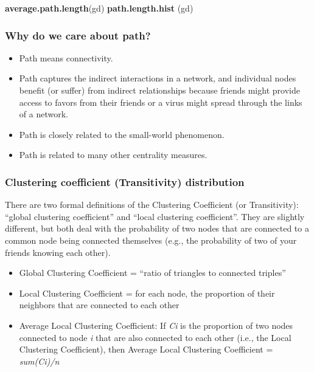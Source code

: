 \documentclass[
]{article}
\newenvironment{Shaded}{\begin{snugshade}}{\end{snugshade}}
\newcommand{\FunctionTok}[1]{\textcolor[rgb]{0.13,0.29,0.53}{\textbf{#1}}}
\newcommand{\NormalTok}[1]{#1}
\providecommand{\tightlist}{%
  \setlength{\itemsep}{0pt}\setlength{\parskip}{0pt}}
\begin{document}
\footnotesize

\begin{Shaded}
\begin{Highlighting}[]
\FunctionTok{average.path.length}\NormalTok{(gd)}
\FunctionTok{path.length.hist}\NormalTok{ (gd)}
\end{Highlighting}
\end{Shaded}

\normalsize

\hypertarget{why-do-we-care-about-path}{%
\subsubsection{Why do we care about path?}\label{why-do-we-care-about-path}}

\begin{itemize}
\item
  Path means connectivity.
\item
  Path captures the indirect interactions in a network, and individual nodes benefit (or suffer) from indirect relationships because friends might provide access to favors from their friends or a virus might spread through the links of a network.
\item
  Path is closely related to the small-world phenomenon.
\item
  Path is related to many other centrality measures.
\end{itemize}

\hypertarget{clustering-coefficient-transitivity-distribution}{%
\subsubsection{Clustering coefficient (Transitivity) distribution}\label{clustering-coefficient-transitivity-distribution}}

There are two formal definitions of the Clustering Coefficient (or Transitivity): ``global clustering coefficient'' and ``local clustering coefficient''. They are slightly different, but both deal with the probability of two nodes that are connected to a common node being connected themselves (e.g., the probability of two of your friends knowing each other).

\begin{itemize}
\tightlist
\item
  Global Clustering Coefficient = ``ratio of triangles to connected triples''
\item
  Local Clustering Coefficient = for each node, the proportion of their neighbors that are connected to each other
\item
  Average Local Clustering Coefficient: If \emph{Ci} is the proportion of two nodes connected to node \emph{i} that are also connected to each other (i.e., the Local Clustering Coefficient), then Average Local Clustering Coefficient = \emph{sum(Ci)/n}
\end{itemize}
\end{document}
